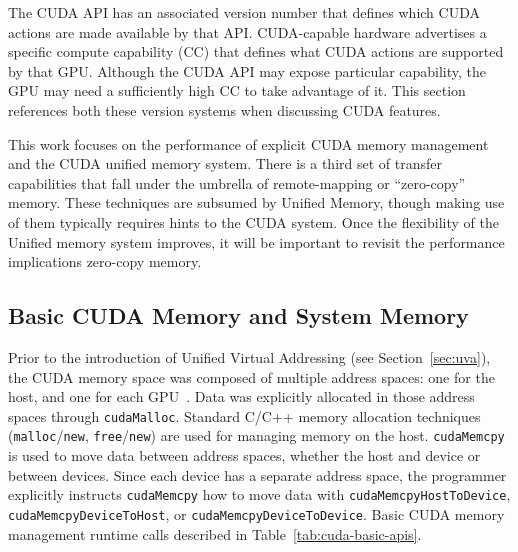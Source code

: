 The CUDA API has an associated version number that defines which CUDA actions are made available by that API.
CUDA-capable hardware advertises a specific compute capability (CC) that defines what CUDA actions are supported by that GPU.
Although the CUDA API may expose particular capability, the GPU may need a sufficiently high CC to take advantage of it.
This section references both these version systems when discussing CUDA features.

This work focuses on the performance of explicit CUDA memory management and the CUDA unified memory system.
There is a third set of transfer capabilities that fall under the umbrella of remote-mapping or ``zero-copy'' memory.
These techniques are subsumed by Unified Memory, though making use of them typically requires hints to the CUDA system.
Once the flexibility of the Unified memory system improves, it will be important to revisit the performance implications zero-copy memory.

\subsection{Basic CUDA Memory and System Memory}

Prior to the introduction of Unified Virtual Addressing (see Section~\ref{sec:uva}), the CUDA memory space was composed of multiple address spaces: one for the host, and one for each GPU~\cite{schroeder2011peer}.
Data was explicitly allocated in those address spaces through \texttt{cudaMalloc}.
Standard C/C++ memory allocation techniques (\texttt{malloc}/\texttt{new}, \texttt{free}/\texttt{new}) are used for managing memory on the host.
\texttt{cudaMemcpy} is used to move data between address spaces, whether the host and device or between devices.
Since each device has a separate address space, the programmer explicitly instructs \texttt{cudaMemcpy} how to move data with \texttt{cudaMemcpyHostToDevice}, \texttt{cudaMemcpyDeviceToHost}, or \texttt{cudaMemcpyDeviceToDevice}.
Basic CUDA memory management runtime calls described in Table~\ref{tab:cuda-basic-apis}.

